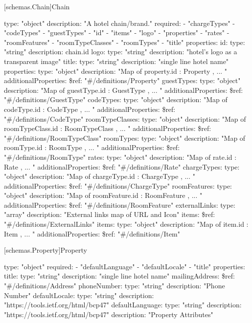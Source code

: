 [schemas.Chain]{Chain}
\begin{codeblock}
  type: "object"
  description: "A hotel chain/brand."
  required:
  - "chargeTypes"
  - "codeTypes"
  - "guestTypes"
  - "id"
  - "items"
  - "logo"
  - "properties"
  - "rates"
  - "roomFeatures"
  - "roomTypeClasses"
  - "roomTypes"
  - "title"
  properties:
    id:
      type: "string"
      description: chain.id
    logo:
      type: "string"
      description: "hotel's logo as a transparent image"
    title:
      type: "string"
      description: "single line hotel name"
    properties:
      type: "object"
      description: "Map of { property.id : { Property }, ... }"
      additionalProperties:
        \$ref: "#/definitions/Property"
    guestTypes:
      type: "object"
      description: "Map of { guestType.id : { GuestType }, ... }"
      additionalProperties:
        \$ref: "#/definitions/GuestType"
    codeTypes:
      type: "object"
      description: "Map of { codeType.id : { CodeType }, ... }"
      additionalProperties:
        \$ref: "#/definitions/CodeType"
    roomTypeClasses:
      type: "object"
      description: "Map of { roomTypeClass.id : { RoomTypeClass }, ... }"
      additionalProperties:
        \$ref: "#/definitions/RoomTypeClass"
    roomTypes:
      type: "object"
      description: "Map of { roomType.id : { RoomType }, ... }"
      additionalProperties:
        \$ref: "#/definitions/RoomType"
    rates:
      type: "object"
      description: "Map of { rate.id : { Rate }, ... }"
      additionalProperties:
        \$ref: "#/definitions/Rate"
    chargeTypes:
      type: "object"
      description: "Map of { chargeType.id : { ChargeType }, ... }"
      additionalProperties:
        \$ref: "#/definitions/ChargeType"
    roomFeatures:
      type: "object"
      description: "Map of { roomFeature.id : { RoomFeature }, ... }"
      additionalProperties:
        \$ref: "#/definitions/RoomFeature"
    externalLinks:
      type: "array"
      description: "External links map of URL and Icon"
      items:
        \$ref: "#/definitions/ExternalLinks"
    items:
      type: "object"
      description: "Map of { item.id : { Item }, ... }"
      additionalProperties:
        \$ref: "#/definitions/Item"
\end{codeblock}

[schemas.Property]{Property}
\begin{codeblock}
  type: "object"
  required:
  - "defaultLanguage"
  - "defaultLocale"
  - "title"
  properties:
    title:
      type: "string"
      description: "single line hotel name"
    mailingAddress:
      \$ref: "#/definitions/Address"
    phoneNumber:
      type: "string"
      description: "Phone Number"
    defaultLocale:
      type: "string"
      description: "https://tools.ietf.org/html/bcp47"
    defaultLanguage:
      type: "string"
      description: "https://tools.ietf.org/html/bcp47"
  description: "Property Attributes"
\end{codeblock}

